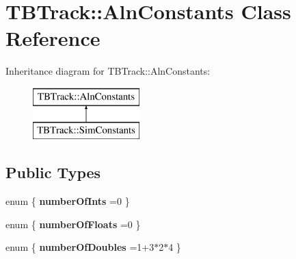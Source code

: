 \section{T\-B\-Track\-:\-:Aln\-Constants Class Reference}
\label{classTBTrack_1_1AlnConstants}
Inheritance diagram for T\-B\-Track\-:\-:Aln\-Constants\-:\begin{figure}[H]
\begin{center}
\leavevmode
\includegraphics[height=2.000000cm]{classTBTrack_1_1AlnConstants}
\end{center}
\end{figure}
\subsection*{Public Types}
\begin{DoxyCompactItemize}
\item 
enum \{ {\bfseries number\-Of\-Ints} =0
 \}
\item 
enum \{ {\bfseries number\-Of\-Floats} =0
 \}
\item 
enum \{ {\bfseries number\-Of\-Doubles} =1+3$\ast$2$\ast$4
 \}
\end{DoxyCompactItemize}

